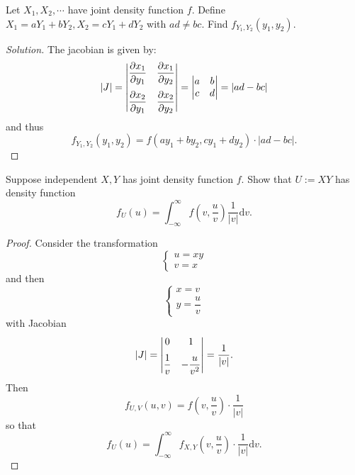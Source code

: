 \documentclass[11pt,singlecolumn, openany, citestyle=authoryear]{elegantbook}
\begin{document}
\begin{CJK}{UTF8}{gbsn}
\begin{example}
    Let $X_1,X_2,\cdots$ have joint density function $f$. Define 
    $X_1=aY_1+bY_2, X_2 = cY_1+dY_2$ with $ad \neq bc$. Find $f_{Y_1,Y_2}(y_1,y_2)$.    
\end{example}
\begin{proof}[Solution]
    The jacobian is given by:
    $$|J|=
    \begin{vmatrix}
        \vspace{1.5ex}
        \dfrac{\partial x_1}{\partial y_1} & \dfrac{\partial x_1}{\partial y_2}\\
        \dfrac{\partial x_2}{\partial y_1} & \dfrac{\partial x_2}{\partial y_2}
    \end{vmatrix}=
    \begin{vmatrix}
        a & b\\
        c & d
    \end{vmatrix}
    = |ad-bc|
    $$
    and thus 
    $$
    f_{Y_1,Y_2}(y_1,y_2)=f(ay_1+by_2,cy_1+dy_2)\cdot |ad-bc|.
    $$
\end{proof}

\begin{example}
    Suppose independent $X,Y$ has joint density function $f$. Show that $U:=XY$ has density 
    function 
    $$
    f_U(u) = \int_{-\infty}^\infty f\left(v,\frac{u}{v}\right)
    \frac{1}{|v|}\mathrm{d}v.
    $$
\end{example}
\begin{proof}
    Consider the transformation 
    $$
    \begin{cases}
        u=xy\\
        v=x
    \end{cases}
    $$
    and then 
    $$
    \begin{cases}
        x=v\\
        y=\dfrac{u}{v}
    \end{cases}
    $$
    with Jacobian 
    $$
    |J|=
    \begin{vmatrix}
        \vspace{1.5ex}
        0 & 1\\
        \dfrac{1}{v}& -\dfrac{u}{v^2}
    \end{vmatrix}
    =\frac{1}{|v|}.
    $$
    Then 
    $$
    f_{U,V}(u,v)=f\left(v,\frac{u}{v}\right)\cdot \frac{1}{|v|}
    $$
    so that 
    $$
    f_U(u)=\int_{-\infty}^\infty f_{X,Y}\left(v,\frac{u}{v}\right)\cdot \frac{1}{|v|}\mathrm{d}v.
    $$
\end{proof}


\end{CJK}
\end{document}

